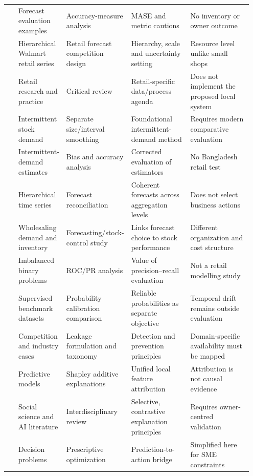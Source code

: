 \begin{landscape}
\begin{longtable}{|p{0.05\linewidth}|p{0.17\linewidth}|p{0.19\linewidth}|p{0.26\linewidth}|p{0.28\linewidth}|}
\cite{hyndman2006accuracy} & Forecast evaluation examples & Accuracy-measure analysis & MASE and metric cautions & No inventory or owner outcome \\
\cite{makridakis2022m5} & Hierarchical Walmart retail series & Retail forecast competition design & Hierarchy, scale and uncertainty setting & Resource level unlike small shops \\
\cite{fildes2022retail} & Retail research and practice & Critical review & Retail-specific data/process agenda & Does not implement the proposed local system \\
\cite{croston1972intermittent} & Intermittent stock demand & Separate size/interval smoothing & Foundational intermittent-demand method & Requires modern comparative evaluation \\
\cite{syntetos2005intermittent} & Intermittent-demand estimates & Bias and accuracy analysis & Corrected evaluation of estimators & No Bangladesh retail test \\
\cite{hyndman2011hierarchical} & Hierarchical time series & Forecast reconciliation & Coherent forecasts across aggregation levels & Does not select business actions \\
\cite{syntetos2010stock} & Wholesaling demand and inventory & Forecasting/stock-control study & Links forecast choice to stock performance & Different organization and cost structure \\
\cite{saito2015pr} & Imbalanced binary problems & ROC/PR analysis & Value of precision--recall evaluation & Not a retail modelling study \\
\cite{niculescu2005calibration} & Supervised benchmark datasets & Probability calibration comparison & Reliable probabilities as separate objective & Temporal drift remains outside evaluation \\
\cite{kaufman2012leakage} & Competition and industry cases & Leakage formulation and taxonomy & Detection and prevention principles & Domain-specific availability must be mapped \\
\cite{lundberg2017shap} & Predictive models & Shapley additive explanations & Unified local feature attribution & Attribution is not causal evidence \\
\cite{miller2019explanation} & Social science and AI literature & Interdisciplinary review & Selective, contrastive explanation principles & Requires owner-centred validation \\
\cite{bertsimas2020prescriptive} & Decision problems & Prescriptive optimization & Prediction-to-action bridge & Simplified here for SME constraints \\
\hline
\end{longtable}
\normalsize
\end{landscape}

